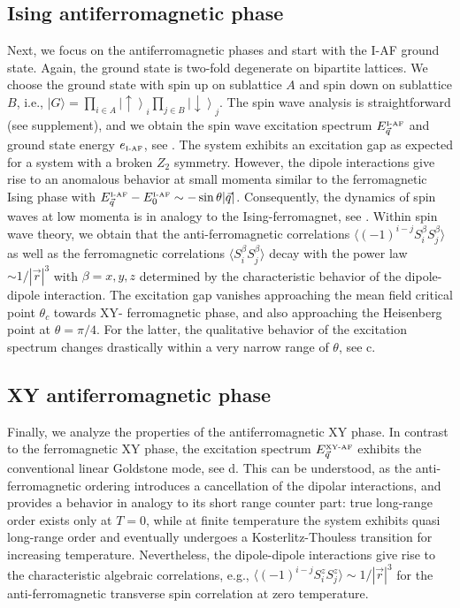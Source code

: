 \subsection{Ising antiferromagnetic phase}
Next, we focus on the antiferromagnetic phases and start with the I-AF ground state.
Again, the ground state is two-fold degenerate on bipartite lattices. We choose the ground state with spin up on sublattice $A$
and spin down on sublattice $B$, i.e., $|G\rangle = \prod_{i \in A} \left|\uparrow\right\rangle_{i} \prod_{j\in B} \left|\downarrow\right\rangle_{j}$.
The spin wave analysis is straightforward (see supplement), and we obtain
the spin wave excitation spectrum $ E^{\mbox{\tiny I-AF}}_{\vec q}$ and ground state energy $ e_{\mbox{\tiny I-AF}}$, see .
The system exhibits an excitation gap as expected for a system with a broken $Z_{2}$ symmetry.
However, the dipole interactions give rise to an anomalous behavior at small momenta similar to
the ferromagnetic Ising phase with $E^{\mbox{\tiny I-AF}}_{\vec q}- E^{\mbox{\tiny I-AF}}_{0} \sim -
\sin \theta |{\vec q}|$. Consequently, the dynamics of spin waves at low momenta is in analogy to the
Ising-ferromagnet, see . Within spin wave theory, we obtain that the anti-ferromagnetic correlations
$\langle (-1)^{i-j} S_{i}^{\beta}S_{j}^{\beta} \rangle$
as well as the ferromagnetic correlations $\langle S_{i}^{\beta}S_{j}^{\beta} \rangle$ decay with the
power law $\sim1/ |{\vec r}|^{3}$ with $\beta = x,y,z$ determined by the characteristic behavior of the dipole-dipole interaction.
The excitation gap vanishes approaching the mean field critical point $\theta_{c}$ towards XY- ferromagnetic
phase, and also approaching the Heisenberg point at $\theta = \pi/4$. For the latter, the qualitative behavior of the excitation spectrum
changes drastically within a very narrow range of $\theta$, see c.



\subsection{XY antiferromagnetic phase}
Finally, we analyze the properties of the antiferromagnetic XY phase.
In contrast to the ferromagnetic XY phase, the excitation spectrum $E^{\mbox{\tiny XY-AF}}_{\vec q}$
exhibits the conventional linear Goldstone mode, see d. This can be understood, as the
anti-ferromagnetic ordering introduces a cancellation of the dipolar interactions, and provides a behavior in analogy to
its short range counter part: true long-range order exists only at $T=0$, while at finite temperature the system
exhibits quasi long-range order and eventually undergoes a Kosterlitz-Thouless transition for increasing temperature.
Nevertheless, the dipole-dipole interactions give rise to the characteristic algebraic correlations, e.g.,
$\langle (-1)^{i-j}S_{i}^{z}S_{j}^{z} \rangle \sim 1/|{\vec r}|^3$ for the anti-ferromagnetic transverse spin correlation at zero temperature.



